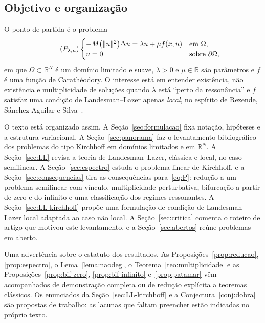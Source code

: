 \documentclass[11pt,a4paper]{article}
\theoremstyle{plain}
\theoremstyle{definition}
\theoremstyle{remark}
\newcommand{\R}{\mathbb{R}}
\newcommand{\norm}[1]{\lVert #1\rVert}
\begin{document}
\subsection{Objetivo e organização}

O ponto de partida é o problema
\begin{equation}\label{eq:P}\tag{$P_{\lambda,\mu}$}
\begin{cases}
-M\bigl(\norm{u}^2\bigr)\Delta u=\lambda u+\mu f(x,u) & \text{em }\Omega,\\
u=0 & \text{sobre }\partial\Omega,
\end{cases}
\end{equation}
em que $\Omega\subset\R^N$ é um domínio limitado e suave, $\lambda>0$ e
$\mu\in\R$ são parâmetros e $f$ é uma função de Carathéodory. O interesse está
em entender existência, não existência e multiplicidade de soluções quando
$\lambda$ está ``perto da ressonância'' e $f$ satisfaz uma condição de
Landesman--Lazer apenas \emph{local}, no espírito de Rezende, Sánchez-Aguilar e
Silva~\cite{RezendeSanchezSilva2019}.

O texto está organizado assim. A Seção~\ref{sec:formulacao} fixa notação,
hipóteses e a estrutura variacional. A Seção~\ref{sec:panorama} faz o
levantamento bibliográfico dos problemas do tipo Kirchhoff em domínios
limitados e em $\R^N$. A Seção~\ref{sec:LL} revisa a teoria de
Landesman--Lazer, clássica e local, no caso semilinear. A
Seção~\ref{sec:espectro} estuda o problema linear de Kirchhoff, e a
Seção~\ref{sec:consequencias} tira as consequências para~\eqref{eq:P}: redução a
um problema semilinear com vínculo, multiplicidade perturbativa, bifurcação a
partir de zero e do infinito e uma classificação dos regimes ressonantes. A
Seção~\ref{sec:LL-kirchhoff} propõe uma formulação de condição de
Landesman--Lazer local adaptada ao caso não local. A
Seção~\ref{sec:critica} comenta o roteiro de artigo que motivou este
levantamento, e a Seção~\ref{sec:abertos} reúne problemas em aberto.

Uma advertência sobre o estatuto dos resultados. As
Proposições~\ref{prop:reducao}, \ref{prop:espectro}, o Lema~\ref{lema:naodeg},
o Teorema~\ref{teo:multiplicidade} e as Proposições~\ref{prop:bif-zero},
\ref{prop:bif-infinito} e~\ref{prop:patamar} vêm acompanhados de demonstração
completa ou de redução explícita a teoremas clássicos. Os enunciados da
Seção~\ref{sec:LL-kirchhoff} e a Conjectura~\ref{conj:dobra} são propostas de
trabalho: as lacunas que faltam preencher estão indicadas no próprio texto.
\end{document}
